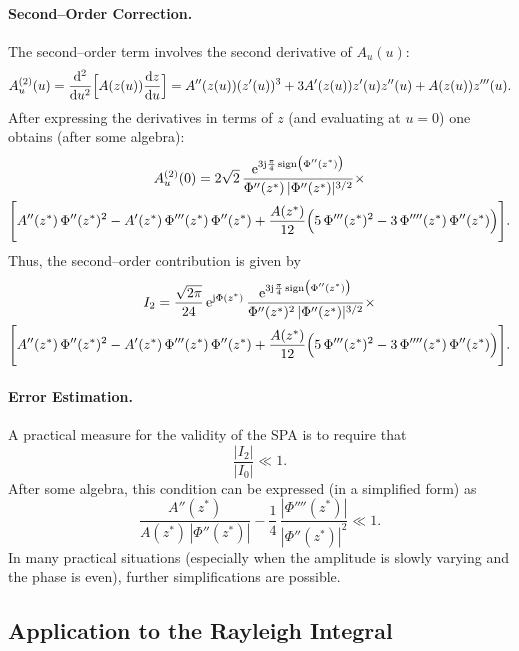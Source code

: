 \documentclass[11pt]{article}
\begin{document}
\paragraph{Second–Order Correction.}  
The second–order term involves the second derivative of \(A_u(u)\):
\begin{equation}
    A_u^{(2)}(u)=\frac{\mathrm{d}^2}{\mathrm{d} u^2}\Bigl[A(z(u))\frac{\mathrm{d} z}{\mathrm{d} u}\Bigr]
    =A''(z(u))(z'(u))^3+3A'(z(u))z'(u)z''(u)+A(z(u))z'''(u).
\end{equation}
After expressing the derivatives in terms of \(z\) (and evaluating at \(u=0\)) one obtains (after some algebra):
\begin{multline}
    A_u^{(2)}(0)=2\sqrt{2}\,\frac{\mathrm{e}^{3\mathrm{j}\frac{\pi}{4}\,\text{sign}\big(\Phi''(z^*)\big)}}{\Phi''(z^*)\,|\Phi''(z^*)|^{3/2}} \times \\
    \Biggl[A''(z^*)\,\Phi''(z^*)^2-A'(z^*)\,\Phi'''(z^*)\,\Phi''(z^*)
    +\frac{A(z^*)}{12}\Bigl(5\,\Phi'''(z^*)^2-3\,\Phi''''(z^*)\,\Phi''(z^*)\Bigr)\Biggr].
\end{multline}
Thus, the second–order contribution is given by
\begin{multline}
    I_2=\frac{\sqrt{2\pi}}{24}\,\mathrm{e}^{\mathrm{j}\Phi(z^*)}\,
    \frac{\mathrm{e}^{3\mathrm{j}\frac{\pi}{4}\,\text{sign}\big(\Phi''(z^*)\big)}}{\Phi''(z^*)^2\,|\Phi''(z^*)|^{3/2}} \times \\
    \Biggl[A''(z^*)\,\Phi''(z^*)^2-A'(z^*)\,\Phi'''(z^*)\,\Phi''(z^*)
    +\frac{A(z^*)}{12}\Bigl(5\,\Phi'''(z^*)^2-3\,\Phi''''(z^*)\,\Phi''(z^*)\Bigr)\Biggr].
\end{multline}

\paragraph{Error Estimation.}  
A practical measure for the validity of the SPA is to require that
\begin{equation}
    \frac{|I_2|}{|I_0|}\ll1.
    \label{eq:SPAvalidity}
\end{equation}
After some algebra, this condition can be expressed (in a simplified form) as
\begin{equation}
    \frac{A''(z^*)}{A(z^*)\,|\Phi''(z^*)|}
    -\frac{1}{4}\,\frac{|\Phi''''(z^*)|}{|\Phi''(z^*)|^2}
    \ll1.
\end{equation}
In many practical situations (especially when the amplitude is slowly varying and the phase is even), further simplifications are possible.

\subsection{Application to the Rayleigh Integral}
\end{document}
